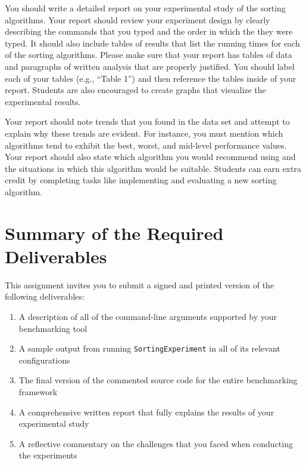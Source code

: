 You should write a detailed report on your experimental study of the sorting algorithms.  Your report should review your
experiment design by clearly describing the commands that you typed and the order in which the they were typed.  It
should also include tables of results that list the running times for each of the sorting algorithms.  Please make sure
that your report has tables of data and paragraphs of written analysis that are properly justified.  You should label
each of your tables (e.g., ``Table 1'') and then reference the tables inside of your report.  Students are also
encouraged to create graphs that visualize the experimental results.

Your report should note trends that you found in the data set and attempt to explain why these trends are evident.  For
instance, you must mention which algorithms tend to exhibit the best, worst, and mid-level performance values.  Your
report should also state which algorithm you would recommend using and the situations in which this algorithm would be
suitable. Students can earn extra credit by completing tasks like implementing and evaluating a new sorting algorithm.

\section*{Summary of the Required Deliverables}

  This assignment invites you to submit a signed and printed version of the following deliverables:

  \begin{enumerate}
  \itemsep0pt
  \item A description of all of the command-line arguments supported by your benchmarking tool

  \item A sample output from running {\tt SortingExperiment} in all of its relevant configurations

  \item The final version of the commented source code for the entire benchmarking framework

  \item A comprehensive written report that fully explains the results of your experimental study

  \item A reflective commentary on the challenges that you faced when conducting the experiments

  \end{enumerate}

